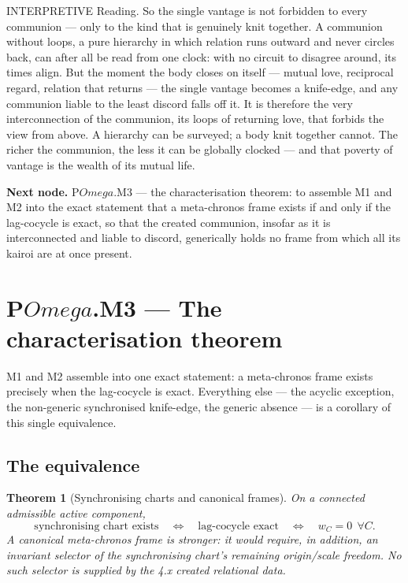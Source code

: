 \documentclass[11pt,a4paper]{article}
\def\Omega{Omega}%
\def\emph#1{#1}%
\newcommand{\stInterp}{\textcolor{cInt}{\textsf{\small INTERPRETIVE}}}
\theoremstyle{definition}
\theoremstyle{plain}
\newtheorem{theorem}[definition]{Theorem}
\theoremstyle{remark}
\begin{document}
\medskip
\stInterp\quad
\emph{Reading.}
So the single vantage is not forbidden to every communion --- only to the kind that is genuinely
knit together. A communion without loops, a pure hierarchy in which relation runs outward and
never circles back, can after all be read from one clock: with no circuit to disagree around,
its times align. But the moment the body closes on itself --- mutual love, reciprocal regard,
relation that returns --- the single vantage becomes a knife-edge, and any communion liable to
the least discord falls off it. It is therefore the very interconnection of the communion, its
loops of returning love, that forbids the view from above. A hierarchy can be surveyed; a body
knit together cannot. The richer the communion, the less it can be globally clocked --- and that
poverty of vantage is the wealth of its mutual life.

\medskip
\textbf{Next node.} P$\Omega$.M3 --- the characterisation theorem: to assemble M1 and M2 into
the exact statement that a meta-chronos frame exists if and only if the lag-cocycle is exact,
so that the created communion, insofar as it is interconnected and liable to discord, generically
holds no frame from which all its kairoi are at once present.

\section{P$\Omega$.M3 --- The characterisation theorem}

M1 and M2 assemble into one exact statement: a meta-chronos frame exists precisely when the
lag-cocycle is exact. Everything else --- the acyclic exception, the non-generic synchronised
knife-edge, the generic absence --- is a corollary of this single equivalence.

\subsection{The equivalence}

\begin{theorem}[Synchronising charts and canonical frames]\label{thm:metacharacterisation}
On a connected admissible active component,
\[
\boxed{\;
\text{synchronising chart exists}
\quad\Longleftrightarrow\quad
\text{lag-cocycle exact}
\quad\Longleftrightarrow\quad
w_C=0\ \ \forall C .
\;}
\]
A canonical meta-chronos frame is stronger: it would require, in addition, an
invariant selector of the synchronising chart's remaining origin/scale freedom.
No such selector is supplied by the 4.x created relational data.
\end{theorem}
\end{document}
